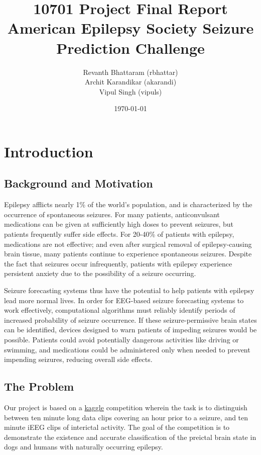 \documentclass[a4paper]{article}
\title{10701 Project Final Report \\
\Large{American Epilepsy Society Seizure Prediction Challenge}}
\author{Revanth Bhattaram (rbhattar) \\ 
Archit Karandikar (akarandi) \\ 
Vipul Singh (vipuls)}
\date{\today}
\begin{document}
\maketitle

\section{Introduction}

\subsection{Background and Motivation}
Epilepsy afflicts nearly 1\% of the world's population, and is characterized by the occurrence of spontaneous seizures. For many patients, anticonvulsant medications can be given at sufficiently high doses to prevent seizures, but patients frequently suffer side effects. For 20-40\% of patients with epilepsy, medications are not effective; and even after surgical removal of epilepsy-causing brain tissue, many patients continue to experience spontaneous seizures. Despite the fact that seizures occur infrequently, patients with epilepsy experience persistent anxiety due to the possibility of a seizure occurring.

Seizure forecasting systems thus have the potential to help patients with epilepsy lead more normal lives. In order for EEG-based seizure forecasting systems to work effectively, computational algorithms must reliably identify periods of increased probability of seizure occurrence. If these seizure-permissive brain states can be identified, devices designed to warn patients of impeding seizures would be possible. Patients could avoid potentially dangerous activities like driving or swimming, and medications could be administered only when needed to prevent impending seizures, reducing overall side effects.

\subsection{The Problem} 
Our project is based on a \href{https://www.kaggle.com/c/seizure-prediction}{kaggle} competition wherein the task is to distinguish between ten minute long data clips covering an hour prior to a seizure, and ten minute iEEG clips of interictal activity. The goal of the competition is to demonstrate the existence and accurate classification of the preictal brain state in dogs and humans with naturally occurring epilepsy.
\end{document}
